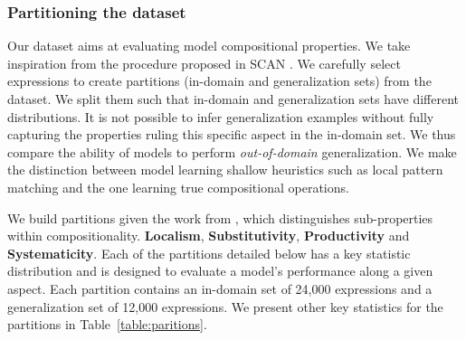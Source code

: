 \subsubsection{Partitioning the dataset}
\label{subsec:partition}


Our dataset aims at evaluating model compositional properties. We take inspiration from the procedure proposed in SCAN \parencite{lake_18, loula_18}. We carefully select expressions to create partitions (in-domain and generalization sets) from the dataset. We split them such that in-domain and generalization sets have different distributions. It is not possible to infer generalization examples without fully capturing the properties ruling this specific aspect in the in-domain set. We thus compare the ability of models to perform \textit{out-of-domain} generalization. We make the distinction between model learning shallow heuristics such as local pattern matching and the one learning true compositional operations.

We build partitions given the work from \textcite{hupkes_20}, which distinguishes sub-properties within compositionality. \textbf{Localism}, \textbf{Substitutivity}, \textbf{Productivity} and \textbf{Systematicity}. Each of the partitions detailed below has a key statistic distribution and is designed to evaluate a model's performance along a given aspect. Each partition contains an in-domain set of 24,000 expressions and a generalization set of 12,000 expressions. We present other key statistics for the partitions in Table~\ref{table:paritions}. 



